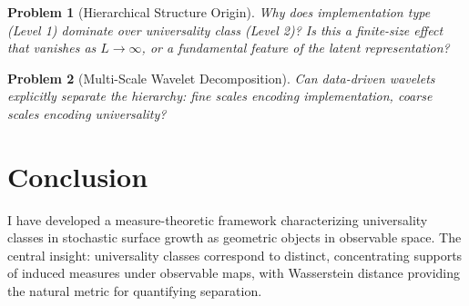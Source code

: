 \documentclass[aps,pre,reprint,amsmath,amssymb,superscriptaddress]{revtex4-2}
\newtheorem{problem}{Problem}
\begin{document}
\begin{problem}[Hierarchical Structure Origin]
Why does implementation type (Level 1) dominate over universality class (Level 2)? Is this a finite-size effect that vanishes as $L \to \infty$, or a fundamental feature of the latent representation?
\end{problem}

\begin{problem}[Multi-Scale Wavelet Decomposition]
Can data-driven wavelets~\cite{FloryanGraham2020} explicitly separate the hierarchy: fine scales encoding implementation, coarse scales encoding universality?
\end{problem}

\section{Conclusion}
\label{sec:conclusion}

I have developed a measure-theoretic framework characterizing universality classes in stochastic surface growth as geometric objects in observable space. The central insight: universality classes correspond to distinct, concentrating supports of induced measures under observable maps, with Wasserstein distance providing the natural metric for quantifying separation.
\end{document}
